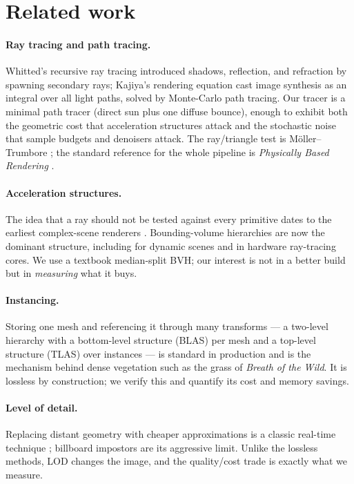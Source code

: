 \section{Related work}
\label{sec:related}

\paragraph{Ray tracing and path tracing.} Whitted's recursive ray tracing
\cite{whitted1980improved} introduced shadows, reflection, and refraction by
spawning secondary rays; Kajiya's rendering equation \cite{kajiya1986rendering}
cast image synthesis as an integral over all light paths, solved by Monte-Carlo
path tracing. Our tracer is a minimal path tracer (direct sun plus one diffuse
bounce), enough to exhibit both the geometric cost that acceleration structures
attack and the stochastic noise that sample budgets and denoisers attack. The
ray/triangle test is Möller--Trumbore \cite{moller1997fast}; the standard
reference for the whole pipeline is \emph{Physically Based Rendering}
\cite{pharr2016physically}.

\paragraph{Acceleration structures.} The idea that a ray should not be tested
against every primitive dates to the earliest complex-scene renderers
\cite{rubin1980representation}. Bounding-volume hierarchies are now the dominant
structure, including for dynamic scenes \cite{wald2007ray} and in hardware
ray-tracing cores. We use a textbook median-split BVH; our interest is not in a
better build but in \emph{measuring} what it buys.

\paragraph{Instancing.} Storing one mesh and referencing it through many
transforms --- a two-level hierarchy with a bottom-level structure (BLAS) per
mesh and a top-level structure (TLAS) over instances --- is standard in production
and is the mechanism behind dense vegetation such as the grass of \emph{Breath of
the Wild}. It is lossless by construction; we verify this and quantify its cost
and memory savings.

\paragraph{Level of detail.} Replacing distant geometry with cheaper
approximations is a classic real-time technique \cite{luebke2003level}; billboard
impostors are its aggressive limit. Unlike the lossless methods, LOD changes the
image, and the quality/cost trade is exactly what we measure.

